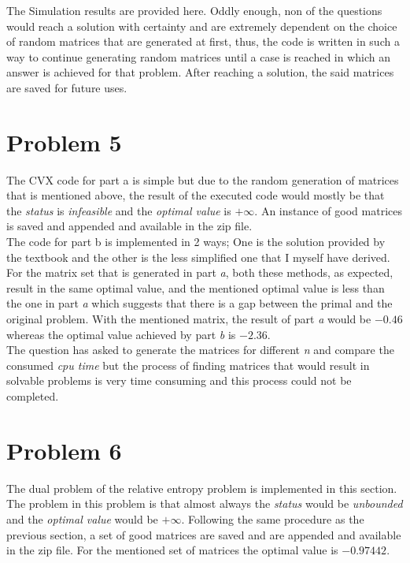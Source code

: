\documentclass[a4paper]{article}
\begin{document}
\thispagestyle{empty}
\newpage
\begin{Large}
	The Simulation results are provided here. Oddly enough, non of the questions would reach a solution with certainty and are extremely dependent on the choice of random matrices that are generated at first, thus, the code is written in such a way to continue generating random matrices until a case is reached in which an answer is achieved for that problem. After reaching a solution, the said matrices are saved for future uses. 
	\section*{Problem 5}
	The CVX code for part a is simple but due to the random generation of matrices that is mentioned above, the result of the executed code would mostly be that the \textit{status} is \textit{infeasible} and the \textit{optimal value} is $ +\infty $. An instance of good matrices is saved and appended and available in the zip file.\\
	The code for part b is implemented in 2 ways; One is the solution provided by the textbook and the other is the less simplified one that I myself have derived. For the matrix set that is generated in part \textit{a}, both these methods, as expected, result in the same optimal value, and the mentioned optimal value is less than the one in part \textit{a} which suggests that there is a gap between the primal and the original problem. With the mentioned matrix, the result of part \textit{a} would be $ -0.46 $ whereas the optimal value achieved by part \textit{b} is $ -2.36 $.\\
	The question has asked to generate the matrices for different \textit{n} and compare the consumed \textit{cpu time} but the process of finding matrices that would result in solvable problems is very  time consuming and this process could not be completed.
	\section*{Problem 6}
	The dual problem of the relative entropy problem is implemented in this section. The problem in this problem is that almost always the \textit{status} would be \textit{unbounded} and the \textit{optimal value} would be $ +\infty $. Following the same procedure as the previous section, a set of good matrices are saved and are appended and available in the zip file. For the mentioned set of matrices the optimal value is $ -0.97442 $.


\end{Large}
\end{document}
